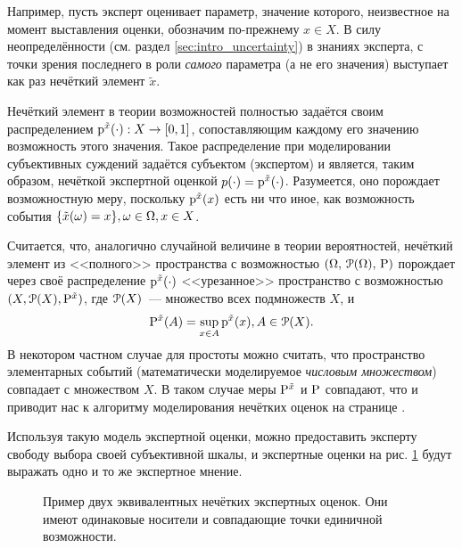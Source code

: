 Например, пусть эксперт оценивает параметр, значение которого, неизвестное на момент выставления оценки, обозначим по-прежнему $x \in X$. В силу неопределённости (см. раздел \ref{sec:intro_uncertainty}) в знаниях эксперта, с точки зрения последнего в роли \emph{самого} параметра (а не его значения) выступает как раз нечёткий элемент $\tilde x$.

Нечёткий элемент в теории возможностей полностью задаётся своим распределением $\p^{\tilde x}(\cdot): X \rightarrow \zo$, сопоставляющим каждому его значению возможность этого значения. Такое распределение при моделировании субъективных суждений задаётся субъектом (экспертом) и является, таким образом, нечёткой экспертной оценкой $p(\cdot) = \p^{\tilde x}(\cdot)$. Разумеется, оно порождает возможностную меру, поскольку $\p^{\tilde x}(x)$ есть ни что иное, как возможность события $\{\tilde x(\om) = x\}, \om \in \Om, x \in X$.

Считается, что, аналогично случайной величине в теории вероятностей, нечёткий элемент из <<полного>> пространства с возможностью $\OAP$ порождает через своё распределение $\p^{\tilde x}(\cdot)$ <<урезанное>> пространство с возможностью $(X, \Po(X), \P^{\tilde x})$, где $\Po(X)$~--- множество всех подмножеств $X$, и
\begin{equation*}
	\P^{\tilde x}(A) = \sup_{x \in A} \p^{\tilde x}(x), A \in \Po(X).
\end{equation*} 
В некотором частном случае для простоты можно считать, что пространство элементарных событий (математически моделируемое \emph{числовым множеством}) совпадает с множеством $X$. В таком случае меры $\P^{\tilde x}$ и $\P$ совпадают, что и приводит нас к алгоритму моделирования нечётких оценок на странице \pageref{zadeh_fuzzy_asset_alg}.

Используя такую модель экспертной оценки, можно предоставить эксперту свободу выбора своей субъективной шкалы, и экспертные оценки на рис. \ref{ris:fuzzy_ass03} будут выражать одно и то же экспертное мнение.
\begin{figure}[h]
\begin{center}
\end{center}
\caption{\small Пример двух эквивалентных нечётких экспертных оценок. Они имеют одинаковые носители и совпадающие точки единичной возможности.}
\label{ris:fuzzy_ass03}
\end{figure}

